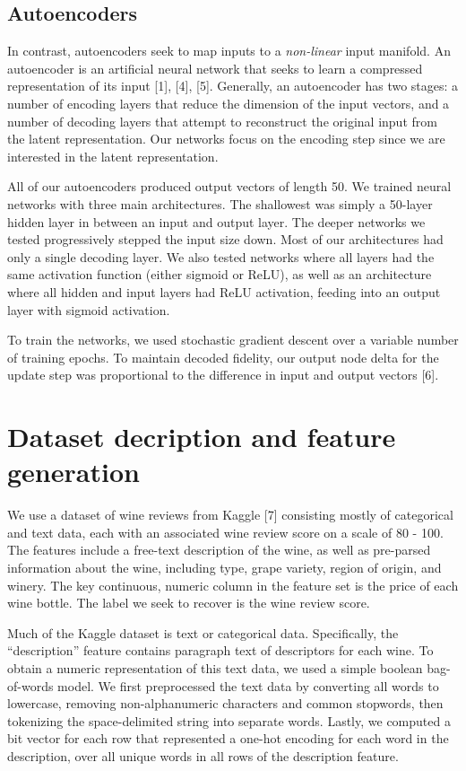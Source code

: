 \documentclass{article}
\begin{document}
\subsection{Autoencoders}
In contrast, autoencoders seek to map inputs to a \emph{non-linear} input manifold. An autoencoder is an artificial neural network that seeks to learn a compressed representation of its input [1], [4], [5]. Generally, an autoencoder has two stages: a number of encoding layers that reduce the dimension of the input vectors, and a number of decoding layers that attempt to reconstruct the original input from the latent representation. Our networks focus on the encoding step since we are interested in the latent representation.

All of our autoencoders produced output vectors of length 50. We trained neural networks with three main architectures. The shallowest was simply a 50-layer hidden layer in between an input and output layer. The deeper networks we tested progressively stepped the input size down. Most of our architectures had only a single decoding layer. We also tested networks where all layers had the same activation function (either sigmoid or ReLU), as well as an architecture where all hidden and input layers had ReLU activation, feeding into an output layer with sigmoid activation.

To train the networks, we used stochastic gradient descent over a variable number of training epochs. To maintain decoded fidelity, our output node delta for the update step was proportional to the difference in input and output vectors [6].
\section{Dataset decription and feature generation}
We use a dataset of wine reviews from Kaggle [7] consisting mostly of categorical and text data, each with an associated wine review score on a scale of 80 - 100. The features include a free-text description of the wine, as well as pre-parsed information about the wine, including type, grape variety, region of origin, and winery. The key continuous, numeric column in the feature set is the price of each wine bottle. The label we seek to recover is the wine review score.

Much of the Kaggle dataset is text or categorical data. Specifically, the “description” feature contains paragraph text of descriptors for each wine. To obtain a numeric representation of this text data, we used a simple boolean bag-of-words model. We first preprocessed the text data by converting all words to lowercase, removing non-alphanumeric characters and common stopwords, then tokenizing the space-delimited string into separate words. Lastly, we computed a bit vector for each row that represented a one-hot encoding for each word in the description, over all unique words in all rows of the description feature.
\end{document}
